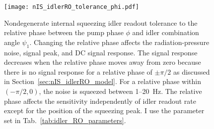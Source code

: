 \begin{figure}
    \centering
    \texttt{[image: nIS\_idlerRO\_tolerance\_phi.pdf]}
    \caption{ Nondegenerate internal squeezing idler readout tolerance to the relative phase between the pump phase $\phi$ and idler combination angle $\psi_1$. Changing the relative phase affects the radiation-pressure noise, signal peak, and DC signal response. The signal response decreases when the relative phase moves away from zero because there is no signal response for a relative phase of $\pm\pi/2$ as discussed in Section~\ref{sec:nIS_idlerRO_model}. For a relative phase within $(-\pi/2,0)$, the noise is squeezed between 1--20~Hz. The relative phase affects the sensitivity independently of idler readout rate except for the position of the squeezing peak. I use the parameter set in Tab.~\ref{tab:idler_RO_parameters}.}
    \label{fig:nIS_idlerRO_tolerance_phi}
\end{figure}

